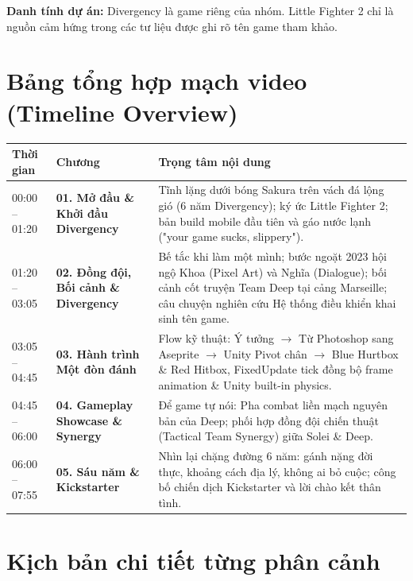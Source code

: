 \documentclass[11pt,a4paper]{article}
\begin{document}
\textbf{Danh tính dự án:} Divergency là game riêng của nhóm. Little Fighter 2 chỉ là nguồn cảm hứng trong các tư liệu được ghi rõ tên game tham khảo.\par

\tableofcontents

\newpage
\section{Bảng tổng hợp mạch video (Timeline Overview)}

\begin{longtable}{@{}p{}p{}p{}@{}}
\toprule
\textbf{Thời gian} & \textbf{Chương} & \textbf{Trọng tâm nội dung} \\
\midrule
\endhead
00:00 -- 01:20 & \textbf{01. Mở đầu \& Khởi đầu Divergency} & Tĩnh lặng dưới bóng Sakura trên vách đá lộng gió (6 năm Divergency); ký ức Little Fighter 2; bản build mobile đầu tiên và gáo nước lạnh ("your game sucks, slippery"). \\
01:20 -- 03:05 & \textbf{02. Đồng đội, Bối cảnh \& Divergency} & Bế tắc khi làm một mình; bước ngoặt 2023 hội ngộ Khoa (Pixel Art) và Nghĩa (Dialogue); bối cảnh cốt truyện Team Deep tại cảng Marseille; câu chuyện nghiên cứu Hệ thống điều khiển khai sinh tên game. \\
03:05 -- 04:45 & \textbf{03. Hành trình Một đòn đánh} & Flow kỹ thuật: Ý tưởng $\rightarrow$ Từ Photoshop sang Aseprite $\rightarrow$ Unity Pivot chân $\rightarrow$ Blue Hurtbox \& Red Hitbox, FixedUpdate tick đồng bộ frame animation \& Unity built-in physics. \\
04:45 -- 06:00 & \textbf{04. Gameplay Showcase \& Synergy} & Để game tự nói: Pha combat liền mạch nguyên bản của Deep; phối hợp đồng đội chiến thuật (Tactical Team Synergy) giữa Solei \& Deep. \\
06:00 -- 07:55 & \textbf{05. Sáu năm \& Kickstarter} & Nhìn lại chặng đường 6 năm: gánh nặng đời thực, khoảng cách địa lý, không ai bỏ cuộc; công bố chiến dịch Kickstarter và lời chào kết thân tình. \\
\bottomrule
\end{longtable}

\newpage
\section{Kịch bản chi tiết từng phân cảnh}

\end{document}
